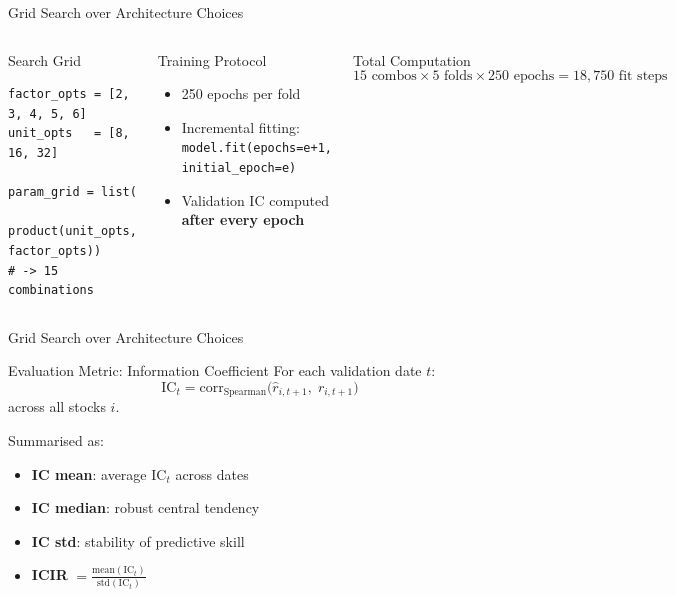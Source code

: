 \documentclass[aspectratio=169, 11pt]{beamer}
\begin{document}
%
%
\begin{frame}[fragile]{Grid Search over Architecture Choices}

\begin{columns}[T]
\begin{block}{Search Grid}
\begin{lstlisting}
factor_opts = [2, 3, 4, 5, 6]
unit_opts   = [8, 16, 32]

param_grid = list(
  product(unit_opts, factor_opts))
# -> 15 combinations
\end{lstlisting}
\end{block}


\begin{block}{Training Protocol}
\begin{itemize}
  \item 250 epochs per fold
  \item Incremental fitting:\\
        \texttt{model.fit(epochs=e+1,\\ initial\_epoch=e)}
  \item Validation IC computed \textbf{after every epoch}
\end{itemize}
\end{block}

\begin{block}{Total Computation}
$$15 \text{ combos} \times 5 \text{ folds} \times 250 \text{ epochs} = 18{,}750 \text{ fit steps}$$
\end{block}

\end{columns}

\end{frame}
%
%
\begin{frame}[fragile]{Grid Search over Architecture Choices}

\begin{exampleblock}{Evaluation Metric: Information Coefficient}
For each validation date $t$:
$$\mathrm{IC}_t = \mathrm{corr}_{\text{Spearman}}\bigl(\hat r_{i,t+1},\; r_{i,t+1}\bigr)$$
across all stocks $i$.

\medskip

Summarised as:
\begin{itemize}
  \item \textbf{IC mean}: average $\mathrm{IC}_t$ across dates
  \item \textbf{IC median}: robust central tendency
  \item \textbf{IC std}: stability of predictive skill
  \item \textbf{ICIR} $= \frac{\text{mean}(\mathrm{IC}_t)}{\text{std}(\mathrm{IC}_t)}$
\end{itemize}
\end{exampleblock}

\end{frame}
\end{document}
